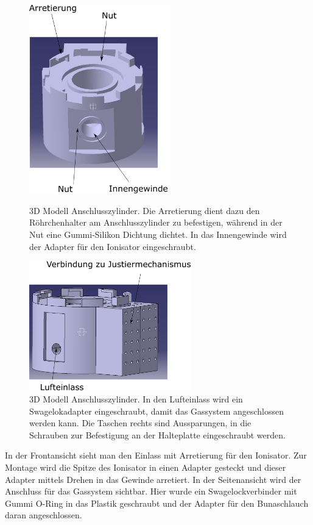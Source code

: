 \begin{figure}[h!]
	\begin{minipage}[hbt]{6.0cm}
		\centering
		\includegraphics[width=6.0cm]{Zylinder_frontal.png}
		\caption[Zylinder V1 frontal]{3D Modell Anschlusszylinder. Die Arretierung dient dazu den Röhrchenhalter am Anschlusszylinder zu befestigen, während in der Nut eine Gummi-Silikon Dichtung dichtet. In das Innengewinde wird der Adapter für den Ionisator eingeschraubt.}
	\end{minipage}
	\hfill
	\begin{minipage}[hbt]{7cm}
		\centering
		\includegraphics[width=7cm]{Zylinder_seitlich.png}
		\caption[Zylinder V1 seitlich]{3D Modell Anschlusszylinder. In den Lufteinlass wird ein Swagelokadapter eingeschraubt, damit das Gassystem angeschlossen werden kann. Die Taschen rechts sind Aussparungen, in die Schrauben zur Befestigung an der Halteplatte eingeschraubt werden.}
	\end{minipage}
\end{figure}


In der Frontansicht sieht man den Einlass mit Arretierung für den Ionisator. Zur Montage wird die Spitze des Ionisator in einen Adapter gesteckt und dieser Adapter mittels Drehen in das Gewinde arretiert. In der Seitenansicht wird der Anschluss für das Gassystem sichtbar. Hier wurde ein Swagelockverbinder mit Gummi O-Ring in das Plastik geschraubt und der Adapter für den Bunaschlauch daran angeschlossen.

